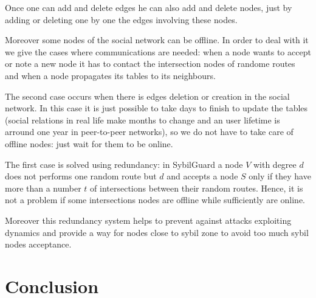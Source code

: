 \documentclass[a4paper,11pt]{article}
\begin{document}
Once one can add and delete edges he can also add and delete nodes, just by adding or deleting one by one the edges involving these nodes.


Moreover some nodes of the social network can be offline.
In order to deal with it we give the cases where communications are needed: when a node wants to accept or note a new node it has to contact the intersection nodes of randome routes and when a node propagates its tables to its neighbours.

The second case occurs when there is edges deletion or creation in the social network.
In this case it is just possible to take days to finish to update the tables (social relations in real life make months to change and an user lifetime is arround one year in peer-to-peer networks), so we do not have to take care of offline nodes: just wait for them to be online. 

The first case is solved using redundancy: in SybilGuard a node $V$ with degree $d$ does not performs one random route but $d$ and accepts a node $S$ only if they have more than a number $t$ of intersections between their random routes.
Hence, it is not a problem if some intersections nodes are offline while sufficiently are online.

Moreover this redundancy system helps to prevent against attacks exploiting dynamics and provide a way for nodes close to sybil zone to avoid too much sybil nodes acceptance. 

\section*{Conclusion}





{}


\end{document}
